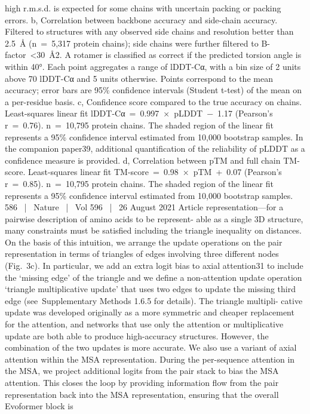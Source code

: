high r.m.s.d. is expected for some chains with uncertain packing or packing
errors. b, Correlation between backbone accuracy and side-chain accuracy.
Filtered to structures with any observed side chains and resolution better than
2.5 Å (n = 5,317 protein chains); side chains were further filtered to
B-factor <30 Å2. A rotamer is classified as correct if the predicted torsion angle
is within 40°. Each point aggregates a range of lDDT-Cα, with a bin size of 2 units
above 70 lDDT-Cα and 5 units otherwise. Points correspond to the mean
accuracy; error bars are 95\% confidence intervals (Student t-test) of the mean
on a per-residue basis. c, Confidence score compared to the true accuracy on
chains. Least-squares linear fit lDDT-Cα = 0.997 × pLDDT − 1.17 (Pearson’s
r = 0.76). n = 10,795 protein chains. The shaded region of the linear fit
represents a 95\% confidence interval estimated from 10,000 bootstrap
samples. In the companion paper39, additional quantification of the reliability
of pLDDT as a confidence measure is provided. d, Correlation between pTM
and full chain TM-score. Least-squares linear fit TM-score = 0.98 × pTM + 0.07
(Pearson’s r = 0.85). n = 10,795 protein chains. The shaded region of the linear fit
represents a 95\% confidence interval estimated from 10,000 bootstrap
samples.
586  |  Nature  |  Vol 596  |  26 August 2021
Article
representation—for a pairwise description of amino acids to be represent-
able as a single 3D structure, many constraints must be satisfied including
the triangle inequality on distances. On the basis of this intuition, we
arrange the update operations on the pair representation in terms of
triangles of edges involving three different nodes (Fig. 3c). In particular,
we add an extra logit bias to axial attention31 to include the ‘missing edge’
of the triangle and we define a non-attention update operation ‘triangle
multiplicative update’ that uses two edges to update the missing third
edge (see Supplementary Methods 1.6.5 for details). The triangle multipli-
cative update was developed originally as a more symmetric and cheaper
replacement for the attention, and networks that use only the attention or
multiplicative update are both able to produce high-accuracy structures.
However, the combination of the two updates is more accurate.
We also use a variant of axial attention within the MSA representation.
During the per-sequence attention in the MSA, we project additional
logits from the pair stack to bias the MSA attention. This closes the loop
by providing information flow from the pair representation back into
the MSA representation, ensuring that the overall Evoformer block is
